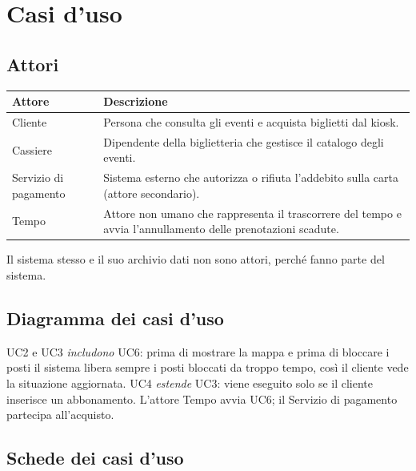\section{Casi d'uso}
\label{sec:casiuso}

\subsection{Attori}


\begin{tabularx}{\textwidth}{@{}L{3.6cm}Y@{}}
\toprule
\textbf{Attore} & \textbf{Descrizione} \\
\midrule
Cliente & Persona che consulta gli eventi e acquista biglietti dal kiosk. \\
Cassiere & Dipendente della biglietteria che gestisce il catalogo degli eventi. \\
Servizio di pagamento & Sistema esterno che autorizza o rifiuta l'addebito sulla carta (attore secondario). \\
Tempo & Attore non umano che rappresenta il trascorrere del tempo e avvia l'annullamento delle prenotazioni scadute. \\
\bottomrule
\end{tabularx}

Il sistema stesso e il suo archivio dati non sono attori, perché fanno parte del sistema.

\subsection{Diagramma dei casi d'uso}


UC2 e UC3 \emph{includono} UC6: prima di mostrare la mappa e prima di bloccare i posti il sistema libera sempre i posti bloccati da troppo tempo, così il cliente vede la situazione aggiornata. UC4 \emph{estende} UC3: viene eseguito solo se il cliente inserisce un abbonamento. L'attore Tempo avvia UC6; il Servizio di pagamento partecipa all'acquisto.

\subsection{Schede dei casi d'uso}


